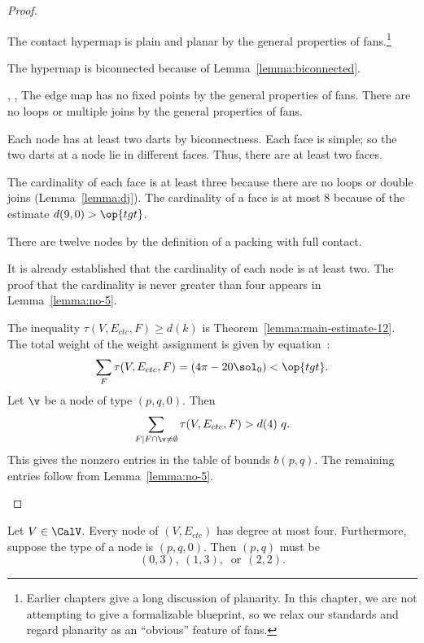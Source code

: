 \begin{proof}
\begin{description}
\item {} The contact hypermap is plain and planar by the
  general properties of fans.\footnote{Earlier chapters give a long
    discussion of planarity.  In this chapter, we are not attempting
    to give a formalizable blueprint, so we relax our standards and
    regard planarity as an ``obvious'' feature of fans.}
\item {} The hypermap is biconnected because of
  Lemma~\ref{lemma:biconnected}.
\item {}, ,  The
  edge map has no fixed points by the general properties of fans.
  There are no loops or multiple joins by the general properties of
  fans.
\item {} Each node has at least two darts by
  biconnectness. Each face is simple; so the two darts at a node lie
  in different faces.  Thus, there are at least two faces.
\item {} The cardinality of each face is at least three
  because there are no loops or double joins (Lemma~\ref{lemma:dj}).
  The cardinality of a face is at most $8$ because of the estimate
  $d(9,0)>\op{tgt}$.
\item {} There are twelve nodes by the definition of a
  packing with full contact.
\item {} It is already established that the cardinality
  of each node is at least two.  The proof that the cardinality is
  never  greater than four appears in Lemma~\ref{lemma:no-5}.
\item {} The inequality $\tau(V,E_{ctc},F)\ge d(k)$ is
  Theorem~\ref{lemma:main-estimate-12}.
  The total weight of the weight assignment is given by
  equation~:
\[
  \sum_F \tau(V,E_{ctc},F) = (4\pi - 20\sol_0) < \op{tgt}.
\]
%
Let $\v$ be a node of type $(p,q,0)$.  
Then
\[
\sum_{F\mid F\cap \v\ne\emptyset}\tau(V,E_{ctc},F) > d(4)~q.
\]
This gives the nonzero entries in the table of bounds $b(p,q)$.  The
remaining entries follow from Lemma~\ref{lemma:no-5}.
\end{description}
\end{proof}




\begin{lemma}[]\label{lemma:no-5} 
  Let $V\in \CalV$.  Every node of $(V,E_{ctc})$ has degree at most
  four.  Furthermore, suppose the type of a node is $(p,q,0)$.  Then
  $(p,q)$ must be
\[
(0,3),~(1,3),~\text{ or}~~(2,2).
\]
\end{lemma}

